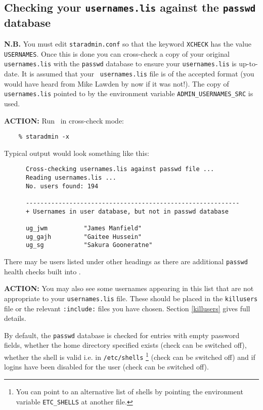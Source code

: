 \subsection{Checking your {\tt usernames.lis} against the {\tt passwd} database}
\label{xcheck_first}

{\bf N.B.} You must edit {\tt staradmin.conf} so that the keyword {\tt XCHECK}
has the value {\tt USERNAMES}. Once this is done you can cross-check a copy of
your original {\tt usernames.lis} with the {\tt passwd} database to  ensure
your {\tt usernames.lis} is up-to-date. It is assumed that your {\tt
usernames.lis} file is of the accepted format (you would have heard from Mike
Lawden by now if it was not!). The copy of {\tt usernames.lis} pointed to by
the environment variable {\tt ADMIN\_USERNAMES\_SRC} is used.

{\large\bf ACTION:} Run \staradmin\ in cross-check mode:

\begin{verbatim}
    % staradmin -x
\end{verbatim}

Typical output would look something like this:

\begin{small}
\begin{verbatim}
      Cross-checking usernames.lis against passwd file ...
      Reading usernames.lis ...
      No. users found: 194

      -----------------------------------------------------------
      + Usernames in user database, but not in passwd database

      ug_jwm          "James Manfield"
      ug_gajh         "Gaitee Hussein"
      ug_sg           "Sakura Gooneratne"

\end{verbatim}
\end{small}

There may be users listed under other headings as there are additional
{\tt passwd} health checks built into \staradmin.

{\large\bf ACTION:} You may also see some usernames appearing in this list that
are not appropriate to your {\tt usernames.lis} file. These should be placed in
the {\tt killusers} file or the relevant {\tt :include:} files you have chosen.
Section \ref{killusers} gives full details.

By default, the {\tt passwd} database is checked for entries with empty
password fields, whether the home directory specified exists (check can be
switched off), whether the shell is valid i.e. in {\tt /etc/shells}
\footnote{You can point to an alternative list of shells by pointing the
environment variable {\tt ETC\_SHELLS} at another file.}
(check can be switched off) and if logins have been disabled for the user
(check can be switched off).

